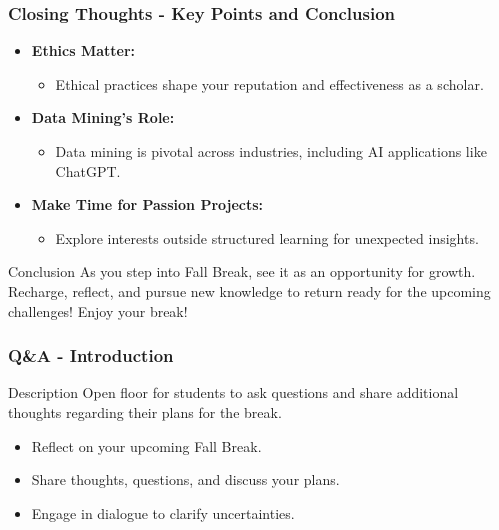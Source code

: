\documentclass[aspectratio=169]{beamer}
\begin{document}
\begin{frame}[fragile]
    \frametitle{Closing Thoughts - Key Points and Conclusion}
    \begin{itemize}
        \item \textbf{Ethics Matter:}
            \begin{itemize}
                \item Ethical practices shape your reputation and effectiveness as a scholar.
            \end{itemize}
        \item \textbf{Data Mining's Role:}
            \begin{itemize}
                \item Data mining is pivotal across industries, including AI applications like ChatGPT.
            \end{itemize}
        \item \textbf{Make Time for Passion Projects:}
            \begin{itemize}
                \item Explore interests outside structured learning for unexpected insights.
            \end{itemize}
    \end{itemize}
    \begin{block}{Conclusion}
        As you step into Fall Break, see it as an opportunity for growth. Recharge, reflect, and pursue new knowledge to return ready for the upcoming challenges! Enjoy your break!
    \end{block}
\end{frame}

\begin{frame}[fragile]
    \frametitle{Q\&A - Introduction}
    \begin{block}{Description}
        Open floor for students to ask questions and share additional thoughts regarding their plans for the break.
    \end{block}
    \begin{itemize}
        \item Reflect on your upcoming Fall Break.
        \item Share thoughts, questions, and discuss your plans.
        \item Engage in dialogue to clarify uncertainties.
    \end{itemize}
\end{frame}
\end{document}
